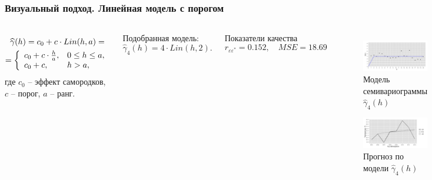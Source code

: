 \documentclass[10pt,pdf,aspectratio=169,hyperref={unicode}]{beamer}
\begin{document}
\begin{frame}
  \frametitle{Визуальный подход. \small{Линейная модель с порогом}}
  \begin{columns}[c]
  \column{3in}
  \begin{equation}\begin{gathered}
  \label{eq:linsill}
    \widehat{\gamma}(h) = c_0 + c \cdot Lin(h, a) = \\
    = \left\{
    \begin{array}{l l}
     c_0 + c \cdot \frac{h}{a}, & 0 \leq h \leq a, \\
     c_0 + c, & h > a,
    \end{array} \right.
  \end{gathered}\end{equation}
  где $ c_0 $ -- эффект самородков, $ c $ -- порог, $ a $ -- ранг.

  \vspace{0.5em}

  Подобранная модель:
  \begin{equation}
  \label{eq:gamma4}
    \widehat{\gamma}_4(h) = 4 \cdot Lin(h, 2).
  \end{equation}

  Показатели качества
  \begin{equation*}
    r_{\varepsilon\varepsilon^{*}} = 0.152, \quad MSE = 18.69
  \end{equation*}

  \column{3in}
  \vspace{-14.5pt}
  \begin{figure}[H]
    \includegraphics[width=0.9\linewidth]{../../figures/variogram/lin-fit-adapt-modeled.png} \\
    \caption{Модель семивариограммы $\widehat{\gamma}_4(h)$}
    \includegraphics[width=0.9\linewidth]{../../figures/variogram/lin-fit-adapt-cross-prediction.png}
    \caption{Прогноз по модели $\widehat{\gamma}_4(h)$}
  \end{figure}
  \end{columns}
\end{frame}
\end{document}
